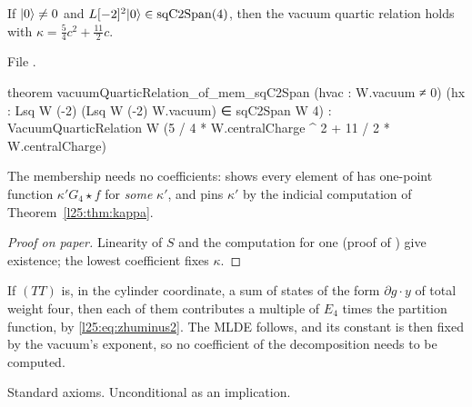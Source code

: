 \begin{theorem}\label{l25:thm:membership}
If $|0\rangle\ne0$ and $L[-2]^2|0\rangle\in\mathrm{sqC2Span}(4)$, then the vacuum quartic relation holds with
$\kappa=\frac54c^2+\frac{11}2c$.
\end{theorem}
\noindent File .
\begin{leancode}
theorem vacuumQuarticRelation_of_mem_sqC2Span (hvac : W.vacuum ≠ 0)
    (hx : Lsq W (-2) (Lsq W (-2) W.vacuum) ∈ sqC2Span W 4) :
    VacuumQuarticRelation W (5 / 4 * W.centralCharge ^ 2 + 11 / 2 * W.centralCharge)
\end{leancode}
\begin{dictionary}
The membership needs no coefficients:  shows every element of
 has one-point function $\kappa'G_4\star f$ for \emph{some} $\kappa'$, and
 pins $\kappa'$ by the indicial computation of
Theorem~\ref{l25:thm:kappa}.
\end{dictionary}
\begin{proof}[Proof on paper]
Linearity of $S$ and the computation for one  (proof of ) give
existence; the lowest coefficient fixes $\kappa$.
\end{proof}
\begin{physics}
If $(TT)$ is, in the cylinder coordinate, a sum of states of the form $\partial g\cdot y$ of total weight four,
then each of them contributes a multiple of $E_4$ times the partition function, by \eqref{l25:eq:zhuminus2}. The MLDE
follows, and its constant is then fixed by the vacuum's exponent, so no coefficient of the decomposition needs to be
computed.
\end{physics}
\begin{status}
Standard axioms. Unconditional as an implication.
\end{status}

